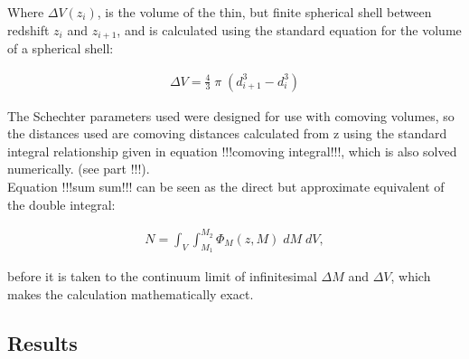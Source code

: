\documentclass[pdf,color]{UoBnote}
\begin{document}
Where $\Delta V(z_i)$, is the volume of the thin, but finite spherical shell between redshift $z_i$ and $z_{i+1}$, and is calculated using the standard equation for the volume of a spherical shell:

\begin{align}	
			\Delta V = \frac{4}{3} \; \pi \; ( d_{i+1}^3 - d_{i}^3)
\end{align}

The Schechter parameters used were designed for use with comoving volumes, so the distances used are comoving distances calculated from z using the standard integral relationship given in equation !!!comoving integral!!!, which is also solved numerically. (see part !!!). \\

Equation !!!sum sum!!! can be seen as the direct but approximate equivalent of the double integral:

\begin{align}
			N = \int_V { \int_{M_1}^{M_2}   { \Phi_M(z,M)  \; dM } \; dV } ,
\end{align}

before it is taken to the continuum limit of infinitesimal $\Delta M$ and $\Delta V$, which makes the calculation mathematically exact.

\subsection{Results}	%



\end{document}
